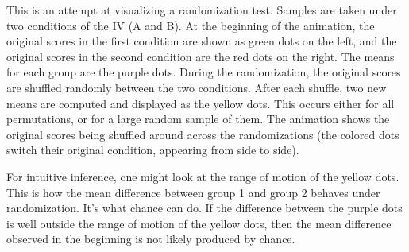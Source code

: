 \documentclass[
  letterpaper,
  DIV=11,
  numbers=noendperiod]{scrreprt}
\begin{document}
This is an attempt at visualizing a randomization test. Samples are
taken under two conditions of the IV (A and B). At the beginning of the
animation, the original scores in the first condition are shown as green
dots on the left, and the original scores in the second condition are
the red dots on the right. The means for each group are the purple dots.
During the randomization, the original scores are shuffled randomly
between the two conditions. After each shuffle, two new means are
computed and displayed as the yellow dots. This occurs either for all
permutations, or for a large random sample of them. The animation shows
the original scores being shuffled around across the randomizations (the
colored dots switch their original condition, appearing from side to
side).

For intuitive inference, one might look at the range of motion of the
yellow dots. This is how the mean difference between group 1 and group 2
behaves under randomization. It's what chance can do. If the difference
between the purple dots is well outside the range of motion of the
yellow dots, then the mean difference observed in the beginning is not
likely produced by chance.
\end{document}
